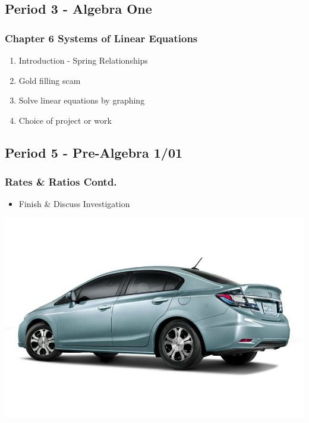      \subsection[ALG]{Period 3 - Algebra One}
     \begin{frame}[label=ALG1]
     	\frametitle{Chapter 6 Systems of Linear Equations}
     	
           \begin{enumerate}
   	   	   \item Introduction - Spring Relationships 
   	   	   \item {} Gold filling scam 
   	   	   \item {} {Solve linear equations by graphing} 
   	   	   \item Choice of project or \Texbook work
   	     \end{enumerate}     	
     	
      \end{frame}
     \subsection[PA1/01]{Period 5 - Pre-Algebra 1/01}
     \begin{frame}[label=PA1_01]
     	    	\frametitle{Rates \& Ratios Contd.}   	
     	    	
     	    	\begin{itemize}
     	    		\item Finish \& Discuss  Investigation 
     	    		\rightarrowitem \mangahighlogo
     	        \end{itemize}   
     	    	\vspace{-20pt}
     	    	\begin{center}
     	    		\includegraphics[width=0.5\linewidth]{Images/honda_civic}
     	    	\end{center}      
     	    	\vspace{-20pt}
     	    \end{frame}
     
